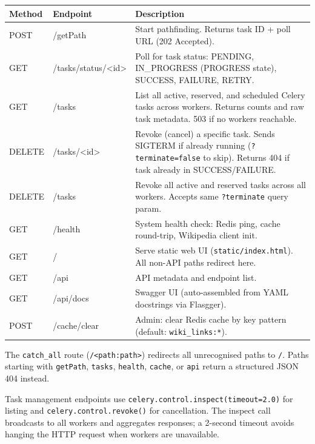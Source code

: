 \documentclass[11pt,a4paper]{article}
\begin{document}
\begin{tabularx}{\textwidth}{@{}l >{\ttfamily}l X@{}}
\toprule
\textbf{Method} & \normalfont\textbf{Endpoint} & \textbf{Description} \\
\midrule
POST   & /getPath & Start pathfinding. Returns task ID + poll URL (202 Accepted). \\
GET    & /tasks/status/<id> & Poll for task status: PENDING, IN\_PROGRESS (PROGRESS state), SUCCESS, FAILURE, RETRY. \\
GET    & /tasks & List all active, reserved, and scheduled Celery tasks across workers. Returns counts and raw task metadata. 503 if no workers reachable. \\
DELETE & /tasks/<id> & Revoke (cancel) a specific task. Sends SIGTERM if already running (\texttt{?terminate=false} to skip). Returns 404 if task already in SUCCESS/FAILURE. \\
DELETE & /tasks & Revoke all active and reserved tasks across all workers. Accepts same \texttt{?terminate} query param. \\
GET    & /health & System health check: Redis ping, cache round-trip, Wikipedia client init. \\
GET    & / & Serve static web UI (\texttt{static/index.html}). All non-API paths redirect here. \\
GET    & /api & API metadata and endpoint list. \\
GET    & /api/docs & Swagger UI (auto-assembled from YAML docstrings via Flasgger). \\
POST   & /cache/clear & Admin: clear Redis cache by key pattern (default: \texttt{wiki\_links:*}). \\
\bottomrule
\end{tabularx}

\begin{notebox}
The \texttt{catch\_all} route (\texttt{/<path:path>}) redirects all unrecognised paths to \texttt{/}. Paths starting with \texttt{getPath}, \texttt{tasks}, \texttt{health}, \texttt{cache}, or \texttt{api} return a structured JSON 404 instead.

Task management endpoints use \texttt{celery.control.inspect(timeout=2.0)} for listing and \texttt{celery.control.revoke()} for cancellation. The inspect call broadcasts to all workers and aggregates responses; a 2-second timeout avoids hanging the HTTP request when workers are unavailable.
\end{notebox}

\end{document}
